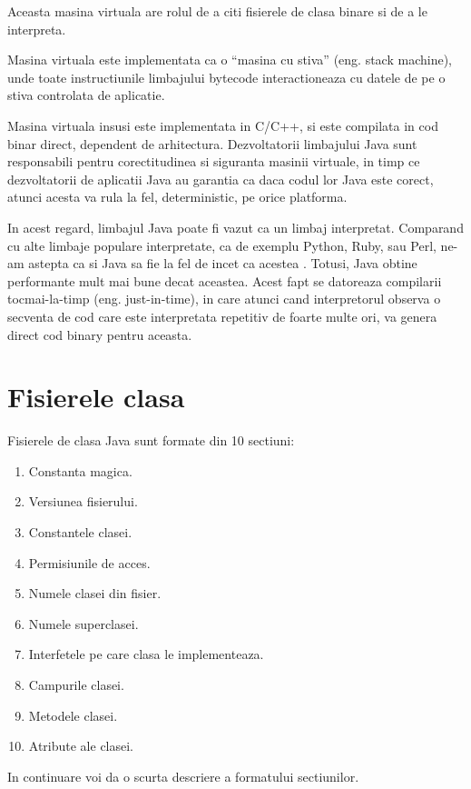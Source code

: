 Aceasta masina virtuala are rolul de a citi fisierele de clasa binare si
de a le interpreta.

Masina virtuala este implementata ca o ``masina cu stiva'' (eng. stack
machine), unde toate instructiunile limbajului bytecode interactioneaza
cu datele de pe o stiva controlata de aplicatie.

Masina virtuala insusi este implementata in C/C++, si este compilata in
cod binar direct, dependent de arhitectura. Dezvoltatorii limbajului
Java sunt responsabili pentru corectitudinea si siguranta masinii
virtuale, in timp ce dezvoltatorii de aplicatii Java au garantia ca daca
codul lor Java este corect, atunci acesta va rula la fel, deterministic,
pe orice platforma.

In acest regard, limbajul Java poate fi vazut ca un limbaj interpretat.
Comparand cu alte limbaje populare interpretate, ca de exemplu Python,
Ruby, sau Perl, ne-am astepta ca si Java sa fie la fel de incet ca
acestea \cite{language_benchmarks}. Totusi, Java obtine performante mult mai bune decat
aceastea. Acest fapt se datoreaza compilarii tocmai-la-timp (eng.
just-in-time), in care atunci cand interpretorul observa o secventa de
cod care este interpretata repetitiv de foarte multe ori, va genera
direct cod binary pentru aceasta.

\section{Fisierele clasa}

Fisierele de clasa Java sunt formate din 10
sectiuni\cite{classfile_sections}:

\begin{enumerate}
\item
  Constanta magica.
\item
  Versiunea fisierului.
\item
  Constantele clasei.
\item
  Permisiunile de acces.
\item
  Numele clasei din fisier.
\item
  Numele superclasei.
\item
  Interfetele pe care clasa le implementeaza.
\item
  Campurile clasei.
\item
  Metodele clasei.
\item
  Atribute ale clasei.
\end{enumerate}

In continuare voi da o scurta descriere a formatului sectiunilor.

